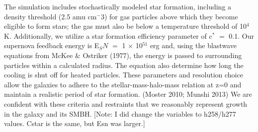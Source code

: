 \documentclass[manuscript]{aastex}
\begin{document}
	The simulation includes stochastically modeled star formation, including a density threshold (2.5 amu cm$^-3$) for gas particles above which they become eligible to form stars; the gas must also be below a temperature threshold of 10$^4$ K. Additionally, we utilize a star formation efficiency parameter of c$^*$ $=$ 0.1. Our supernova feedback energy is E$_SN$ $=$ 1 $\times$ 10$^51$ erg and, using the blastwave equations from McKee \& Ostriker (1977), the energy is passed to surrounding particles within a calculated radius. The equation also determine how long the cooling is shut off for heated particles. These parameters and resolution choice allow the galaxies to adhere to the stellar-mass-halo-mass relation at z=0 and maintain a realistic period of star formation. (Moster 2010; Munshi 2013) We are confident with these criteria and restraints that we reasonably represent growth in the galaxy and its SMBH. [Note: I did change the variables to h258/h277 values. Cstar is the same, but Esn was larger.]

\end{document}
